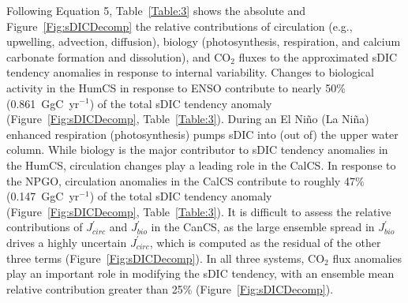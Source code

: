 \documentclass[hvmath, online,bgd]{copernicus_discussions}
\begin{document}
Following Equation 5, Table~\ref{Table:3} shows the absolute and Figure~\ref{Fig:sDICDecomp} the relative contributions of circulation (e.g., upwelling, advection, diffusion), biology (photosynthesis, respiration, and calcium carbonate formation and dissolution), and CO$_{2}$ fluxes to the approximated sDIC tendency anomalies in response to internal variability. Changes to biological activity in the HumCS in response to ENSO contribute to nearly 50\% (0.861~GgC~yr$^{-1}$) of the total sDIC tendency anomaly (Figure~\ref{Fig:sDICDecomp}, Table~\ref{Table:3}). During an El Ni\~no (La Ni\~na) enhanced respiration (photosynthesis) pumps sDIC into (out of) the upper water column. While biology is the major contributor to sDIC tendency anomalies in the HumCS, circulation changes play a leading role in the CalCS. In response to the NPGO, circulation anomalies in the CalCS contribute to roughly 47\% (0.147~GgC~yr$^{-1}$) of the total sDIC tendency anomaly (Figure~\ref{Fig:sDICDecomp}, Table~\ref{Table:3}). It is difficult to assess the relative contributions of $ J^{\prime}_{circ}$ and $ J^{\prime}_{bio}$ in the CanCS, as the large ensemble spread in $ J^{\prime}_{bio}$ drives a highly uncertain $ J^{\prime}_{circ}$, which is computed as the residual of the other three terms (Figure~\ref{Fig:sDICDecomp}). In all three systems, CO$_{2}$ flux anomalies play an important role in modifying the sDIC tendency, with an ensemble mean relative contribution greater than 25\% (Figure~\ref{Fig:sDICDecomp}).

 
%
%
% 
%
\end{document}
